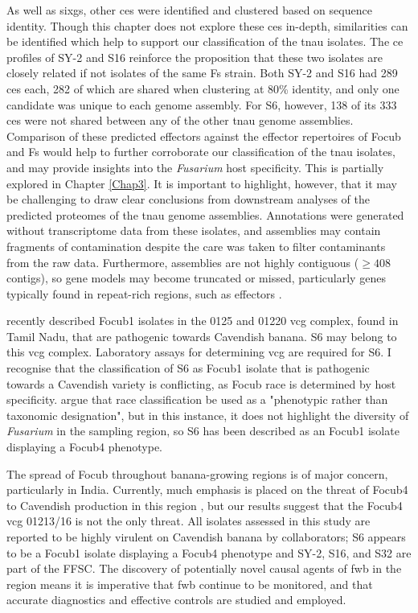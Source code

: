 As well as \acp{sixg}, other \acfp{ce} were identified and clustered based on sequence identity. Though this chapter does not explore these \acp{ce} in-depth, similarities can be identified which help to support our classification of the \ac{tnau} isolates. The \ac{ce} profiles of SY-2 and S16 reinforce the proposition that these two isolates are closely related if not isolates of the same \ac{Fs} strain. Both SY-2 and S16 had 289 \acp{ce} each, 282 of which are shared when clustering at 80\% identity, and only one candidate was unique to each genome assembly. For S6, however, 138 of its 333 \acp{ce} were not shared between any of the other \ac{tnau} genome assemblies. Comparison of these predicted effectors against the effector repertoires of \ac{Focub} and \ac{Fs} would help to further corroborate our classification of the \ac{tnau} isolates, and may provide insights into the \textit{Fusarium} host specificity. This is partially explored in Chapter \ref{Chap3}. It is important to highlight, however, that it may be challenging to draw clear conclusions from downstream analyses of the predicted proteomes of the \ac{tnau} genome assemblies. Annotations were generated without transcriptome data from these isolates, and assemblies may contain fragments of contamination despite the care was taken to filter contaminants from the raw data. Furthermore, assemblies are not highly contiguous ($ \geq408$ contigs), so gene models may become truncated or missed, particularly genes typically found in repeat-rich regions, such as effectors \parencite{Schmidt2013}. 

\textcite{Thangavelu2020} recently described \ac{Focub1} isolates in the 0125 and 01220 \ac{vcg} complex, found in Tamil Nadu, that are pathogenic towards Cavendish banana. S6 may belong to this \ac{vcg} complex. Laboratory assays for determining \ac{vcg} are required for S6. I recognise that the classification of S6 as \ac{Focub1} isolate that is pathogenic towards a Cavendish variety is conflicting, as \ac{Focub} race is determined by host specificity. \textcite{Torres2021} argue that race classification be used as a "phenotypic rather than taxonomic designation", but in this instance, it does not highlight the diversity of \textit{Fusarium} in the sampling region, so S6 has been described as an \ac{Focub1} isolate displaying a \ac{Focub4} phenotype.

The spread of \ac{Focub} throughout banana-growing regions is of major concern, particularly in India. Currently, much emphasis is placed on the threat of \ac{Focub4} to Cavendish production in this region \parencite{Viljoen2020, Damodaran2019}, but our results suggest that the \ac{Focub4} \ac{vcg} 01213/16 is not the only threat. All isolates assessed in this study are reported to be highly virulent on Cavendish banana by collaborators; S6 appears to be a \ac{Focub1} isolate displaying a \ac{Focub4} phenotype and SY-2, S16, and S32 are part of the \ac{FFSC}. The discovery of potentially novel causal agents of \ac{fwb} in the region means it is imperative that \ac{fwb} continue to be monitored, and that accurate diagnostics and effective controls are studied and employed.  
